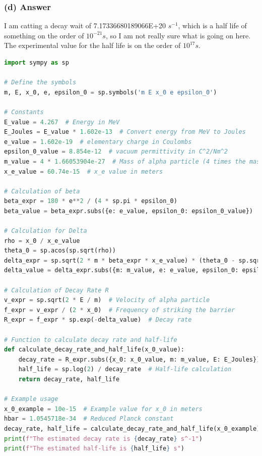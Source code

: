 \documentclass{article}
\begin{document}
\subsubsection*{(d) Answer}
I am catting a decay wait of 7.17336680189066E+20 $s^{-1}$, which is a half life of something on the order of $10^{-21}s$, so I am not really sure what is going on here. The experimental value for the half life is on the order of $10^{17}s$.
\begin{lstlisting}[language=Python]
import sympy as sp

# Define the symbols
m, E, x_0, e, epsilon_0 = sp.symbols('m E x_0 e epsilon_0')

# Constants
E_value = 4.267  # Energy in MeV
E_Joules = E_value * 1.602e-13  # Convert energy from MeV to Joules
e_value = 1.602e-19  # elementary charge in Coulombs
epsilon_0_value = 8.854e-12  # vacuum permittivity in C^2/Nm^2
m_value = 4 * 1.66053904e-27  # Mass of alpha particle (4 times the mass of a proton)
x_e_value = 60.74e-15  # x_e value in meters

# Calculation of beta
beta_expr = 180 * e**2 / (4 * sp.pi * epsilon_0)
beta_value = beta_expr.subs({e: e_value, epsilon_0: epsilon_0_value})

# Calculation for Delta
rho = x_0 / x_e_value
theta_0 = sp.acos(sp.sqrt(rho))
delta_expr = sp.sqrt(2 * m * beta_expr * x_e_value) * (theta_0 - sp.sqrt(rho) * sp.sqrt(1 - rho))
delta_value = delta_expr.subs({m: m_value, e: e_value, epsilon_0: epsilon_0_value, x_0: rho * x_e_value})

# Calculation of Decay Rate R
v_expr = sp.sqrt(2 * E / m)  # Velocity of alpha particle
f_expr = v_expr / (2 * x_0)  # Frequency of striking the barrier
R_expr = f_expr * sp.exp(-delta_value)  # Decay rate

# Function to calculate decay rate and half-life
def calculate_decay_rate_and_half_life(x_0_value):
    decay_rate = R_expr.subs({x_0: x_0_value, m: m_value, E: E_Joules}).evalf()
    half_life = sp.log(2) / decay_rate  # Half-life calculation
    return decay_rate, half_life

# Example usage
x_0_example = 10e-15  # Example value for x_0 in meters
hbar = 1.0545718e-34  # Reduced Planck constant
decay_rate, half_life = calculate_decay_rate_and_half_life(x_0_example)
print(f"The estimated decay rate is {decay_rate} s^-1")
print(f"The estimated half-life is {half_life} s")

\end{lstlisting}
\end{document}
